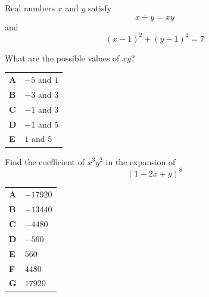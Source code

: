 \documentclass[11pt,a4paper]{article}
\begin{document}
\clearpage
\thispagestyle{djspaper}
\vspace*{8pt}
\begin{enumerate}[label=\textbf{\arabic*.},leftmargin=*,itemsep=0pt,start=10]
\questionitem[Algebra]
Real numbers $x$ and $y$ satisfy
\[x+y=xy\]
and
\[(x-1)^2+(y-1)^2=7\]

What are the possible values of $xy$?

\par\vspace*{12pt}
\begin{tabularx}{\linewidth}{@{}>{\bfseries}l Y@{}}
A &
$-5$ and $1$
\\[0.8em]
B &
$-3$ and $3$
\\[0.8em]
C &
$-1$ and $3$
\\[0.8em]
D &
$-1$ and $5$
\\[0.8em]
E &
$1$ and $5$
\\
\end{tabularx}
\end{enumerate}
\clearpage
\thispagestyle{djspaper}
\vspace*{8pt}
\begin{enumerate}[label=\textbf{\arabic*.},leftmargin=*,itemsep=0pt,start=11]
Find the coefficient of $x^3y^2$ in the expansion of \[(1-2x+y)^8\]

\par\vspace*{12pt}
\begin{tabularx}{\linewidth}{@{}>{\bfseries}l Y@{}}
A &
$-17920$
\\[0.8em]
B &
$-13440$
\\[0.8em]
C &
$-4480$
\\[0.8em]
D &
$-560$
\\[0.8em]
E &
$560$
\\[0.8em]
F &
$4480$
\\[0.8em]
G &
$17920$
\\
\end{tabularx}
\end{enumerate}
\end{document}
